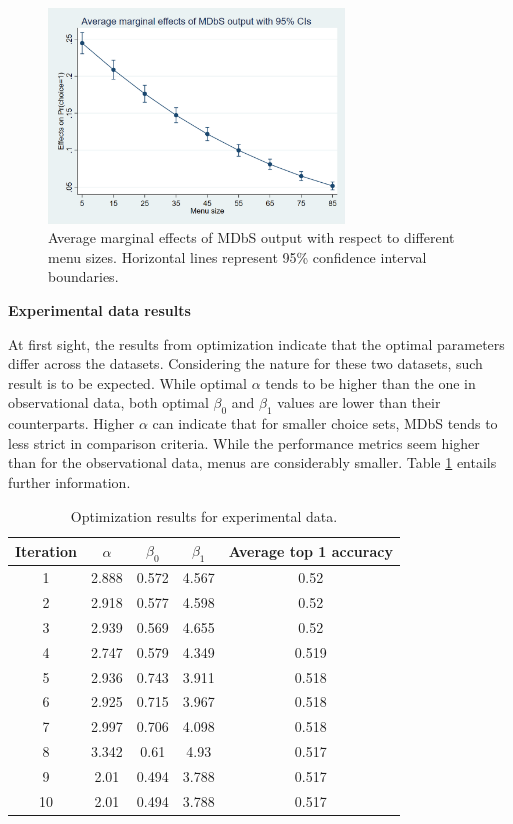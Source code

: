 \documentclass[a4paper,12pt]{article}
\begin{document}
\begin{figure}[h]
    \centering
    \includegraphics[width=0.7\textwidth]{staticFiles/marginsAmadeusGraph.png}
    \caption{Average marginal effects of MDbS output with respect to different menu sizes. Horizontal lines represent 95\% confidence interval boundaries.} %
    \label{fig:marginsAmadeusGraph} %

\end{figure}

\textbf{Experimental data results}

At first sight, the results from optimization indicate that the optimal parameters differ across the datasets. Considering the nature for these two datasets, such result is to be expected. While optimal $\alpha$ tends to be higher than the one in observational data, both optimal $\beta_0$ and $\beta_1$ values are lower than their counterparts. Higher $\alpha$ can indicate that for smaller choice sets, MDbS tends to less strict in comparison criteria. While the performance metrics seem higher than for the observational data, menus are considerably smaller. Table \ref{tab:optimizationNoghuchiResults} entails further information.


\begin{table}
    \centering
    
    \begin{tabular}{ccccc}
    \hline
    Iteration & $\alpha$ & $\beta_0$ & $\beta_1$ & Average top 1 accuracy\\
    \hline
    1 & 2.888 & 0.572 & 4.567 & 0.52 \\
    2 & 2.918 & 0.577 & 4.598 & 0.52 \\
    3 & 2.939 & 0.569 & 4.655 & 0.52 \\
    4 & 2.747 & 0.579 & 4.349 & 0.519 \\
    5 & 2.936 & 0.743 & 3.911 & 0.518 \\
    6 & 2.925 & 0.715 & 3.967 & 0.518 \\
    7 & 2.997 & 0.706 & 4.098 & 0.518 \\
    8 & 3.342 & 0.61 & 4.93 & 0.517 \\
    9 & 2.01 & 0.494 & 3.788 & 0.517 \\
    10 & 2.01 & 0.494 & 3.788 & 0.517 \\
    \hline
    \end{tabular}
    \caption{Optimization results for experimental data.}
    \label{tab:optimizationNoghuchiResults}
\end{table}
\end{document}
